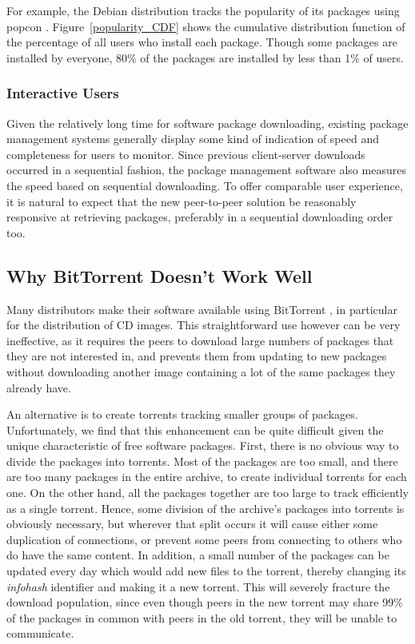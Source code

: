 \documentclass[conference]{IEEEtran}
\begin{document}
For example, the Debian distribution tracks the popularity of its
packages using popcon \cite{popcon}. Figure~\ref{popularity_CDF}
shows the cumulative distribution function of the percentage of all
users who install each package. Though some packages are installed
by everyone, 80\% of the packages are installed by less than 1\% of
users.

\subsubsection{Interactive Users}

Given the relatively long time for software package downloading, existing package management systems generally display
some kind of indication of speed and completeness for users to
monitor. Since previous client-server downloads occurred in a sequential
fashion, the package management software also measures the speed
based on sequential downloading. To offer comparable user experience, it is natural to expect that
the new peer-to-peer solution be reasonably responsive at retrieving packages,
preferably in a sequential downloading order too.

\subsection{Why BitTorrent Doesn't Work Well}
\label{bittorrent}

Many distributors make their software available using
BitTorrent \cite{COHEN03}, in particular for the distribution of CD
images. This straightforward use however can be very ineffective, as it requires the
peers to download large numbers of packages that they are not
interested in, and prevents them from updating to new packages
without downloading another image containing a lot of the same
packages they already have.

An alternative is to create torrents tracking smaller groups of packages. Unfortunately, we find that this enhancement can be
quite difficult given the unique characteristic of free software packages.
First, there is no obvious way to divide the packages into torrents.
Most of the packages are too small, and there are too many packages
in the entire archive, to create individual torrents for each one.
On the other hand, all the packages together are too large to track
efficiently as a single torrent. Hence, some division of the archive's
packages into torrents is obviously necessary, but wherever that
split occurs it will cause either some duplication of connections,
or prevent some peers from connecting to others who do have the same
content. In addition, a small number of the packages can be updated every
day which would add new files to the torrent, thereby changing its
\emph{infohash} identifier and making it a new torrent. This will
severely fracture the download population, since even though peers in the
new torrent may share 99\% of the packages in common with peers in the
old torrent, they will be unable to communicate.
\end{document}
